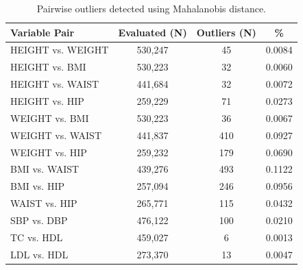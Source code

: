\documentclass[12pt]{article}
\begin{document}
\begin{appendix}
    \begin{table}[H]
        \centering
        \caption{Pairwise outliers detected using Mahalanobis distance.}
        \begin{tabular}{lccc}
            \toprule
            Variable Pair & Evaluated (N) & Outliers (N) & \% \\
            \midrule
            HEIGHT vs. WEIGHT & 530,247 & 45 & 0.0084\\
            HEIGHT vs. BMI & 530,223 & 32 & 0.0060\\
            HEIGHT vs. WAIST & 441,684 & 32 & 0.0072\\
            HEIGHT vs. HIP & 259,229 & 71 & 0.0273\\
            WEIGHT vs. BMI & 530,223 & 36 & 0.0067\\
            WEIGHT vs. WAIST & 441,837 & 410 & 0.0927\\
            WEIGHT vs. HIP & 259,232 & 179 & 0.0690\\
            BMI vs. WAIST & 439,276 & 493 & 0.1122\\
            BMI vs. HIP & 257,094 & 246 & 0.0956\\
            WAIST vs. HIP & 265,771 & 115 & 0.0432\\
            SBP vs. DBP & 476,122 & 100 & 0.0210\\
            TC vs. HDL & 459,027 & 6 & 0.0013\\
            LDL vs. HDL & 273,370 & 13 & 0.0047\\
            \bottomrule
            \end{tabular}
    \end{table}


\end{appendix}
\end{document}
